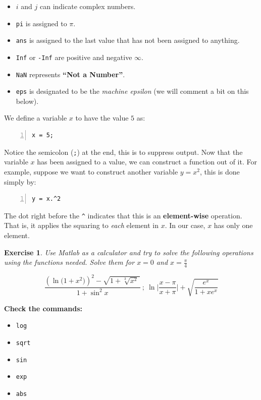 \documentclass[a4paper,11pt]{article}
\newtheorem{exercise}{Exercise}
\begin{document}
\begin{itemize}
	\item $i$ and $j$ can indicate complex numbers.
	\item \verb;pi; is assigned to $\pi$.
	\item \verb;ans; is assigned to the last value that has not been assigned to anything.
	\item \verb;Inf; or \verb;-Inf; are positive and negative $\infty$.
	\item \verb;NaN; represents \textbf{``Not a Number''}.
	\item \verb;eps; is designated to be the \textit{machine epsilon} (we will comment a bit on this below).
\end{itemize}

We define a variable $x$ to have the value $5$ as:

\begin{Verbatim}[numbers=left]
x = 5;
\end{Verbatim}

Notice the semicolon (\verb+;+) at the end, this is to suppress output. Now that the variable $x$ has been assigned to a value, we can construct a function out of it. For example, suppose we want to construct another variable $y = x^2$, this is done simply by:

\begin{Verbatim}[numbers=left]
y = x.^2
\end{Verbatim}

The dot right before the \verb+^+ indicates that this is an \textbf{element-wise} operation. That is, it applies the squaring to \textit{each} element in $x$. In our case, $x$ has only one element.

\begin{exercise} 
Use Matlab as a calculator and try to solve the following operations using the functions needed. Solve them for $x = 0$ and $x = \frac{\pi}{4}$

\[
		\frac{\left(\ln\big( 1+x^2\big)\right)^2 - \sqrt{1+\sqrt[3]{x^2}\,}}{1+\sin^2 x} \ ; \  \ln\bigg\lvert\frac{x-\pi}{x+\pi}\bigg\rvert + \sqrt{\frac{e^x}{1+xe^x}}
\]
\end{exercise}

\textbf{Check the commands:}
\begin{itemize}
	\item \verb+log+
	\item \verb+sqrt+
	\item \verb+sin+
	\item \verb+exp+
	\item \verb+abs+
\end{itemize}
\end{document}
